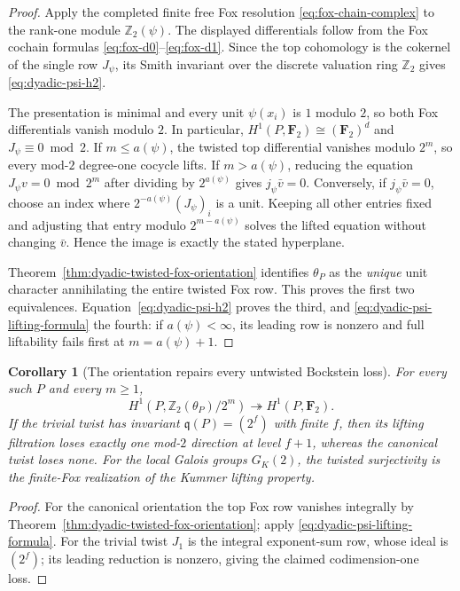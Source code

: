 \documentclass[11pt]{article}
\newtheorem{corollary}[theorem]{Corollary}
\theoremstyle{definition}
\begin{document}
\begin{proof}
Apply the completed finite free Fox resolution
\eqref{eq:fox-chain-complex} to the rank-one module
$\mathbb Z_2(\psi)$.  The displayed differentials
follow from the Fox cochain formulas
\eqref{eq:fox-d0}--\eqref{eq:fox-d1}.
Since the top cohomology is the cokernel of
the single row $J_\psi$, its Smith invariant
over the discrete valuation ring $\mathbb Z_2$
gives \eqref{eq:dyadic-psi-h2}.

The presentation is minimal and every unit
$\psi(x_i)$ is $1$ modulo $2$, so both Fox
differentials vanish modulo $2$.  In particular,
$H^1(P,\mathbf F_2)\cong(\mathbf F_2)^d$ and
$J_\psi\equiv0\bmod2$.
If $m\le a(\psi)$, the twisted top differential
vanishes modulo $2^m$, so every mod-$2$ degree-one
cocycle lifts.  If $m>a(\psi)$, reducing the
equation $J_\psi v=0\bmod2^m$ after dividing by
$2^{a(\psi)}$ gives $j_\psi\bar v=0$.
Conversely, if $j_\psi\bar v=0$, choose an index
where $2^{-a(\psi)}(J_\psi)_i$ is a unit.  Keeping
all other entries fixed and adjusting that entry
modulo $2^{m-a(\psi)}$ solves the lifted equation
without changing $\bar v$.  Hence the image is
exactly the stated hyperplane.

Theorem~\ref{thm:dyadic-twisted-fox-orientation}
identifies $\theta_P$ as the \emph{unique} unit
character annihilating the entire twisted Fox row.
This proves the first two equivalences.
Equation~\eqref{eq:dyadic-psi-h2} proves the third,
and \eqref{eq:dyadic-psi-lifting-formula} the fourth:
if $a(\psi)<\infty$, its leading row is nonzero
and full liftability fails first at $m=a(\psi)+1$.
\end{proof}

\begin{corollary}[The orientation repairs every untwisted Bockstein loss]
\label{cor:dyadic-orientation-kummer-lifts}
For every such $P$ and every $m\ge1$,
\[
H^1(P,\mathbb Z_2(\theta_P)/2^m)
\twoheadrightarrow H^1(P,\mathbf F_2).
\]
If the trivial twist has invariant
$\mathfrak q(P)=(2^f)$ with finite $f$,
then its lifting filtration loses exactly
one mod-$2$ direction at level $f+1$,
whereas the canonical twist loses none.
For the local Galois groups $G_K(2)$,
the twisted surjectivity is the finite-Fox
realization of the Kummer lifting property.
\end{corollary}

\begin{proof}
For the canonical orientation the top Fox row
vanishes integrally by
Theorem~\ref{thm:dyadic-twisted-fox-orientation};
apply \eqref{eq:dyadic-psi-lifting-formula}.
For the trivial twist $J_1$ is the integral
exponent-sum row, whose ideal is $(2^f)$;
its leading reduction is nonzero, giving
the claimed codimension-one loss.
\end{proof}
\end{document}
